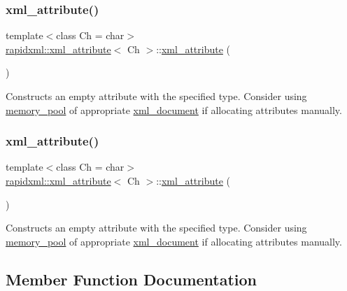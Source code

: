 \subsubsection{\texorpdfstring{xml\+\_\+attribute()}{xml\_attribute()}\hspace{0.1cm}{\footnotesize\ttfamily [1/2]}}
{\footnotesize\ttfamily template$<$class Ch = char$>$ \\
\mbox{\hyperlink{classrapidxml_1_1xml__attribute}{rapidxml\+::xml\+\_\+attribute}}$<$ Ch $>$\+::\mbox{\hyperlink{classrapidxml_1_1xml__attribute}{xml\+\_\+attribute}} (\begin{DoxyParamCaption}{ }\end{DoxyParamCaption})\hspace{0.3cm}{\ttfamily [inline]}}

Constructs an empty attribute with the specified type. Consider using \mbox{\hyperlink{classrapidxml_1_1memory__pool}{memory\+\_\+pool}} of appropriate \mbox{\hyperlink{classrapidxml_1_1xml__document}{xml\+\_\+document}} if allocating attributes manually. \mbox{\label{classrapidxml_1_1xml__attribute_a26be291103917d3e8de110d46dd83816}} 
\subsubsection{\texorpdfstring{xml\+\_\+attribute()}{xml\_attribute()}\hspace{0.1cm}{\footnotesize\ttfamily [2/2]}}
{\footnotesize\ttfamily template$<$class Ch = char$>$ \\
\mbox{\hyperlink{classrapidxml_1_1xml__attribute}{rapidxml\+::xml\+\_\+attribute}}$<$ Ch $>$\+::\mbox{\hyperlink{classrapidxml_1_1xml__attribute}{xml\+\_\+attribute}} (\begin{DoxyParamCaption}{ }\end{DoxyParamCaption})\hspace{0.3cm}{\ttfamily [inline]}}

Constructs an empty attribute with the specified type. Consider using \mbox{\hyperlink{classrapidxml_1_1memory__pool}{memory\+\_\+pool}} of appropriate \mbox{\hyperlink{classrapidxml_1_1xml__document}{xml\+\_\+document}} if allocating attributes manually. 

\subsection{Member Function Documentation}
\mbox{\label{classrapidxml_1_1xml__attribute_ab0ff3bc7880a6969ddcf0bb1e0444077}} 
